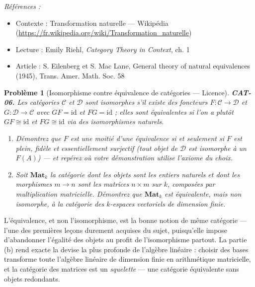\documentclass[11pt]{article}
\newtheorem{problem}{Problème}
\newenvironment{refs}{\par\small\noindent\emph{Références :}\begin{itemize}\setlength\itemsep{0pt}}{\end{itemize}\normalsize}
\begin{document}
\begin{refs}
\item Contexte : Transformation naturelle --- Wikipédia (\url{https://fr.wikipedia.org/wiki/Transformation_naturelle})
\item Lecture : Emily Riehl, \textit{Category Theory in Context}, ch. 1
\item Article : S. Eilenberg et S. Mac Lane, \og{} General theory of natural equivalences \fg{} (1945), Trans. Amer. Math. Soc. 58
\end{refs}

\bigskip

\begin{problem}[{Isomorphisme contre équivalence de catégories --- Licence}]
\textbf{CAT-06.} Les catégories $ \mathcal{C} $ et $ \mathcal{D} $ sont
\textit{isomorphes} s'il existe des foncteurs $ F\colon \mathcal{C} \to \mathcal{D} $ et
$ G\colon \mathcal{D} \to \mathcal{C} $ avec $ GF = \mathrm{id} $ et
$ FG = \mathrm{id} $ ; elles sont \textit{équivalentes} si l'on a plutôt $ GF \cong \mathrm{id} $ et
$ FG \cong \mathrm{id} $ via des isomorphismes naturels.
\begin{enumerate}
\item[(a)] Démontrez que $ F $ est une moitié d'une
équivalence si et seulement si $ F $ est plein, fidèle et essentiellement surjectif (tout
objet de $ \mathcal{D} $ est isomorphe à un $ F(A) $) --- et repérez où votre démonstration
utilise l'axiome du choix.
\item[(b)] Soit $ \mathbf{Mat}_k $ la catégorie dont les objets sont les
entiers naturels et dont les morphismes $ m \to n $ sont les matrices $ n \times m $ sur
$ k $, composées par multiplication matricielle. Démontrez que $ \mathbf{Mat}_k $ est
équivalente, mais non isomorphe, à la catégorie des $ k $-espaces vectoriels de dimension finie.
\end{enumerate}

\end{problem}

\noindent L'équivalence, et non l'isomorphisme, est la bonne notion de \og{} même catégorie \fg{} ---
l'une des premières leçons durement acquises du sujet, puisqu'elle impose d'abandonner l'égalité
des objets au profit de l'isomorphisme partout. La partie (b) rend exacte la devise la plus
profonde de l'algèbre linéaire : choisir des bases transforme toute l'algèbre linéaire de
dimension finie en arithmétique matricielle, et la catégorie des matrices est un \textit{squelette} ---
une catégorie équivalente sans objets redondants.
\end{document}
